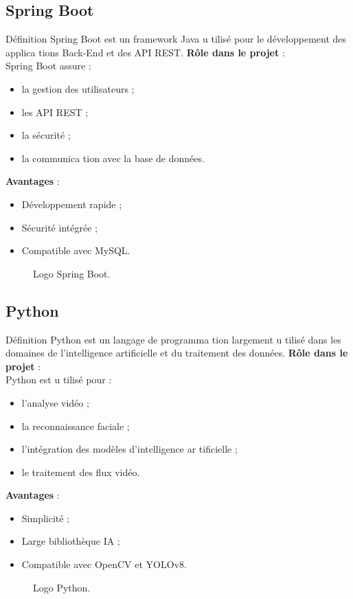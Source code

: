 \documentclass[12pt,a4paper]{report}
\numberwithin{figure}{chapter}
\numberwithin{table}{chapter}
\begin{document}
\subsection{Spring Boot}
Déﬁnition
Spring Boot est un framework Java u tilisé pour le développement des applica tions Back-End et des
API REST.
\textbf{Rôle dans le projet} : \\
Spring Boot assure :
\begin{itemize}
  \item la gestion des utilisateurs ;
  \item les API REST ;
  \item la sécurité ;
  \item la communica tion avec la base de données.
\end{itemize}
\textbf{Avantages} : \\
\begin{itemize}
  \item Développement rapide ;
  \item Sécurité intégrée ;
  \item Compatible avec MySQL.
\end{itemize}
\begin{figure}[H]
  \centering
  \caption{Logo Spring Boot.}
\end{figure}
\subsection{Python}
Déﬁnition
Python est un langage de programma tion largement u tilisé dans les domaines de l’intelligence
artiﬁcielle et du traitement des données.
\textbf{Rôle dans le projet} : \\
Python est u tilisé pour :
\begin{itemize}
  \item l’analyse vidéo ;
  \item la reconnaissance faciale ;
  \item l’intégration des modèles d’intelligence ar tiﬁcielle ;
  \item le traitement des ﬂux vidéo.
\end{itemize}
\textbf{Avantages} : \\
\begin{itemize}
  \item Simplicité ;
  \item Large bibliothèque IA ;
  \item Compatible avec OpenCV et YOLOv8.
\end{itemize}
\begin{figure}[H]
  \centering
  \caption{Logo Python.}
\end{figure}
\end{document}
